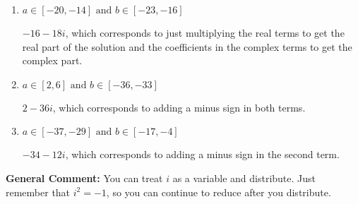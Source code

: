 \documentclass{extbook}[14pt]
\begin{document}
\begin{enumerate}
{\begin{enumerate}[label=\Alph*.]
* $2 + 36 i$, which is the correct option.
\item \( a \in [-20, -14] \text{ and } b \in [-23, -16] \)

 $-16 - 18 i$, which corresponds to just multiplying the real terms to get the real part of the solution and the coefficients in the complex terms to get the complex part.
\item \( a \in [2, 6] \text{ and } b \in [-36, -33] \)

 $2 - 36 i$, which corresponds to adding a minus sign in both terms.
\item \( a \in [-37, -29] \text{ and } b \in [-17, -4] \)

 $-34 - 12 i$, which corresponds to adding a minus sign in the second term.
\end{enumerate}

\textbf{General Comment:} You can treat $i$ as a variable and distribute. Just remember that $i^2=-1$, so you can continue to reduce after you distribute.
}
\end{enumerate}
\end{document}
